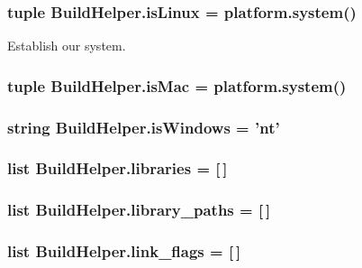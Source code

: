 \hypertarget{namespaceBuildHelper_a2b4ffb2416b43239c8380120262128c6}{
\subsubsection[{is\-Linux}]{\setlength{\rightskip}{0pt plus 5cm}tuple Build\-Helper.\-is\-Linux = platform.\-system()}}\label{namespaceBuildHelper_a2b4ffb2416b43239c8380120262128c6}


Establish our system. 

\hypertarget{namespaceBuildHelper_a636f10d9e3cea6a72e75fd7ce7c5a9d0}{
\subsubsection[{is\-Mac}]{\setlength{\rightskip}{0pt plus 5cm}tuple Build\-Helper.\-is\-Mac = platform.\-system()}}\label{namespaceBuildHelper_a636f10d9e3cea6a72e75fd7ce7c5a9d0}
\hypertarget{namespaceBuildHelper_a75da1b5396066bf9c0e36148920fafa6}{
\subsubsection[{is\-Windows}]{\setlength{\rightskip}{0pt plus 5cm}string Build\-Helper.\-is\-Windows = 'nt'}}\label{namespaceBuildHelper_a75da1b5396066bf9c0e36148920fafa6}
\hypertarget{namespaceBuildHelper_ab4bf9ec0398d0d80656452e9a5591d2b}{
\subsubsection[{libraries}]{\setlength{\rightskip}{0pt plus 5cm}list Build\-Helper.\-libraries = \mbox{[}$\,$\mbox{]}}}\label{namespaceBuildHelper_ab4bf9ec0398d0d80656452e9a5591d2b}
\hypertarget{namespaceBuildHelper_aab7e6b32acfafe36dae0386194168a29}{
\subsubsection[{library\-\_\-paths}]{\setlength{\rightskip}{0pt plus 5cm}list Build\-Helper.\-library\-\_\-paths = \mbox{[}$\,$\mbox{]}}}\label{namespaceBuildHelper_aab7e6b32acfafe36dae0386194168a29}
\hypertarget{namespaceBuildHelper_a655fd191e806d11d88de4f82bfd56b1e}{
\subsubsection[{link\-\_\-flags}]{\setlength{\rightskip}{0pt plus 5cm}list Build\-Helper.\-link\-\_\-flags = \mbox{[}$\,$\mbox{]}}}\label{namespaceBuildHelper_a655fd191e806d11d88de4f82bfd56b1e}

